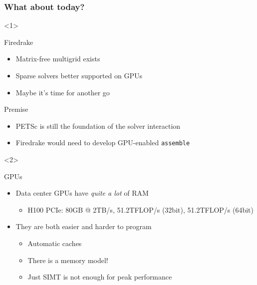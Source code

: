 \documentclass[aspectratio=169]{beamer}
\begin{document}
\begin{frame}[fragile]
  \frametitle{What about today?}

  \begin{onlyenv}<1>
    \begin{block}{Firedrake}
      \begin{itemize}
      \item Matrix-free multigrid exists
      \item Sparse solvers better supported on GPUs
      \item Maybe it's time for another go
      \end{itemize}
    \end{block}
    \begin{block}{Premise}
      \begin{itemize}
      \item PETSc is still the foundation of the solver interaction
      \item Firedrake would need to develop GPU-enabled \verb~assemble~
      \end{itemize}
    \end{block}
  \end{onlyenv}
  \begin{onlyenv}<2>
    \begin{block}{GPUs}
      \begin{itemize}
      \item Data center GPUs have \emph{quite a lot} of RAM
        \begin{itemize}
        \item H100 PCIe: 80GB @ 2TB/s, 51.2TFLOP/s (32bit),
          51.2TFLOP/s (64bit)
        \end{itemize}
      \item They are both easier and harder to program
        \begin{itemize}
        \item Automatic caches
        \item There is a memory model!
        \item Just SIMT is not enough for peak performance
        \end{itemize}
      \end{itemize}
    \end{block}
  \end{onlyenv}
\end{frame}
\end{document}
